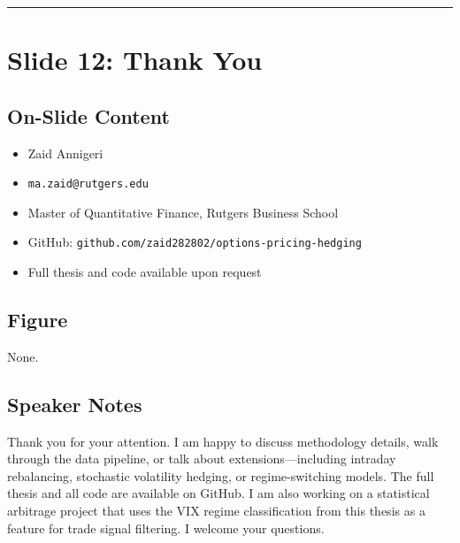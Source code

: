 \documentclass[11pt, letterpaper]{article}
\begin{document}
\noindent\rule{\textwidth}{0.4pt}

\section{Slide 12: Thank You}

\subsection*{On-Slide Content}
\begin{itemize}[nosep]
  \item Zaid Annigeri
  \item \texttt{ma.zaid@rutgers.edu}
  \item Master of Quantitative Finance, Rutgers Business School
  \item GitHub: \texttt{github.com/zaid282802/options-pricing-hedging}
  \item Full thesis and code available upon request
\end{itemize}

\subsection*{Figure}
None.

\subsection*{Speaker Notes}
Thank you for your attention. I am happy to discuss methodology details, walk through the data pipeline, or talk about extensions---including intraday rebalancing, stochastic volatility hedging, or regime-switching models. The full thesis and all code are available on GitHub. I am also working on a statistical arbitrage project that uses the VIX regime classification from this thesis as a feature for trade signal filtering. I welcome your questions.
\end{document}
